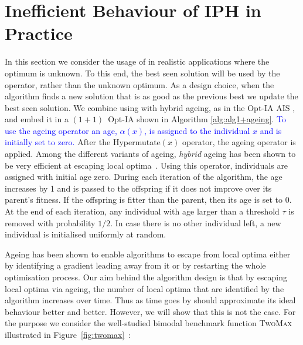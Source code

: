 \documentclass[lettersize,journal]{IEEEtran}
\newcommand{\new}[1]{\textcolor{blue}{#1}}
\begin{document}
 	\section{Inefficient Behaviour of IPH in Practice}In this section we consider the usage of  {\expoHD } in realistic applications where the optimum is unknown.
 	To this end, the best seen solution will be used by the operator, rather than the unknown optimum. {\color{blue} As a design choice, when the algorithm finds a new solution that is as good as the previous best we update the best seen solution.}
 	We combine \IPHfcm{} using {\expoHD } with hybrid ageing, as in the Opt-IA AIS \cite{CutelloNicosiaPavoneTimmis2007}, and embed it in a $(1+1)$~Opt-IA shown in Algorithm \ref{alg:alg1+ageing}. \new{To use the ageing operator an age, $\alpha(x)$, is assigned to the individual $x$ and is initially set to zero.} After the Hypermutate$(x)$ operator, %
 	the ageing operator is applied.
 	Among the different variants of ageing, {\it hybrid} ageing has been shown to be very efficient at escaping local optima~\cite{OlivetoSudholt2014ageing,CorusOlivetoYazdaniGECCO2017,CorusOlivetoYazdaniPPSN2018Approx}. Using this operator,  individuals are assigned with initial age zero. During each iteration of the algorithm, the age  increases by 1 and is passed to the offspring if it does not improve over its parent's fitness. If the offspring is fitter than the parent, then its age is set to 0. At the end of each iteration, any individual with age larger than a threshold $\tau$ is removed with probability $1/2$. In case there is no other individual left, a new individual is initialised uniformly at random. 
 
 Ageing has been shown to enable algorithms to escape from local optima either by identifying a gradient leading away from it or by restarting the whole optimisation process. Our aim behind the algorithm design is that by escaping local optima via ageing, the number of local optima that are identified by the algorithm increases over time. Thus as time goes by {\expoHD } should approximate its ideal behaviour better and better.
 	However, we will show that this is not the case. For the purpose we consider the well-studied
 	bimodal benchmark function \textsc{TwoMax} %
 	illustrated in Figure~\ref{fig:twomax}~\cite{FriedrichOSWECJ09,SudholtBookChapter2019,OlivetoSudholtZarges2018,CovantesOsunaSudholt2017,CorusLissovoiOlivetoWittTELO2021}:
 	
\end{document}

